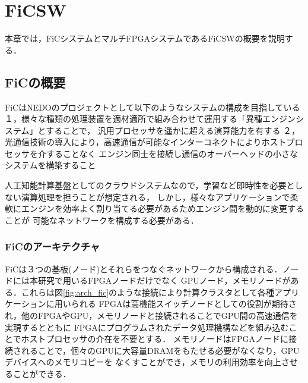 \chapter{FiCSW}
{
\label{chap:ficsw}
本章では，FiCシステムとマルチFPGAシステムであるFiCSWの概要を説明する．

\section{FiCの概要}
\label{sec:about_fic}
FiCはNEDOのプロジェクトとして以下のようなシステムの構成を目指している
１，様々な種類の処理装置を適材適所で組み合わせて運用する「異種エンジンシステム」とすることで，
汎用プロセッサを遥かに超える演算能力を有する
２，光通信技術の導入により，高速通信が可能なインターコネクトによりホストプロセッサを介することなく
エンジン同士を接続し通信のオーバーヘッドの小さなシステムを構築すること

人工知能計算基盤としてのクラウドシステムなので，学習など即時性を必要としない演算処理を担うことが想定される，
しかし，様々なアプリケーションで柔軟にエンジンを効率よく割り当てる必要があるためエンジン間を動的に変更することが
可能なネットワークを構成する必要がある．
\subsection{FiCのアーキテクチャ}
\label{sec:arch_fic}
FiCは３つの基板(ノード)とそれらをつなぐネットワークから構成される．ノードには本研究で用いるFPGAノードだけでなく
GPUノード，メモリノードがある．これらは図\ref{fig:arch_fic}のような接続により計算クラスタとして各種アプリケーションに用いられる
FPGAは高機能スイッチノードとしての役割が期待され，他のFPGAやGPU，メモリノードと接続されることでGPU間の高速通信を実現するとともに
FPGAにプログラムされたデータ処理機構などを組み込むことでホストプロセッサの介在を不要とする．
メモリノードはFPGAノードに接続されることで，個々のGPUに大容量DRAMをもたせる必要がなくなり，GPUデバイスへのメモリコピーを
なくすことができ，メモリの利用効率を向上させることができる．
}
